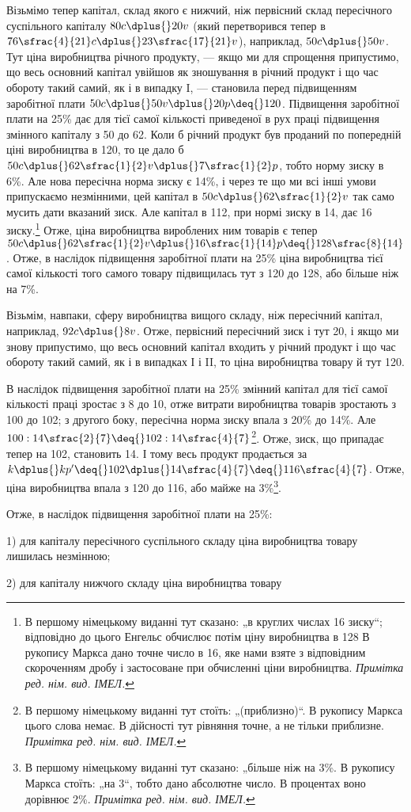 
Візьмімо тепер капітал, склад якого є нижчий, ніж первісний
склад пересічного суспільного капіталу $80 c \dplus{} 20 v$ (який
перетворився тепер в $76\sfrac{4}{21}c \dplus{} 23\sfrac{17}{21}v$), наприклад, $50 c \dplus{} 50 v$.
Тут ціна виробництва річного продукту, — якщо ми для спрощення
припустимо, що весь основний капітал увійшов як зношування
в річний продукт і що час обороту такий самий, як
і в випадку I, — становила перед підвищенням заробітної плати
$50 c \dplus{} 50 v \dplus{} 20 p \deq{} 120$. Підвищення заробітної плати на 25\%
дає для тієї самої кількості приведеної в рух праці підвищення
змінного капіталу з 50 до 62. Коли б річний продукт був
проданий по попередній ціні виробництва в 120, то це дало б
$50 c \dplus{} 62\sfrac{1}{2}v \dplus{} 7\sfrac{1}{2}p$, тобто норму зиску в 6\%.
Але нова пересічна норма зиску є 14\%, і через те що ми всі інші умови
припускаємо незмінними, цей капітал в $50 c \dplus{} 62\sfrac{1}{2}v$ так само
мусить дати вказаний зиск. Але капітал в 112, при нормі зиску
в 14, дає 16 зиску.\footnote*{
В першому німецькому виданні тут сказано: „в круглих числах 16
зиску“; відповідно до цього Енгельс обчислює потім ціну виробництва в 128
В рукопису Маркса дано точне число в 16, яке нами взяте з відповідним
скороченням дробу і застосоване при обчисленні ціни виробництва.
\emph{Примітка ред. нім. вид. ІМЕЛ.}
} Отже, ціна виробництва вироблених
ним товарів є тепер $50 c \dplus{} 62\sfrac{1}{2}v \dplus{} 16\sfrac{1}{14}p \deq{} 128\sfrac{8}{14}$. Отже, в наслідок
підвищення заробітної плати на 25\% ціна виробництва
тієї самої кількості того самого товару підвищилась тут з 120
до 128, або більше ніж на 7\%.

Візьмім, навпаки, сферу виробництва вищого складу, ніж пересічний
капітал, наприклад, $92 c \dplus{} 8 v$. Отже, первісний пересічний
зиск і тут \deq{} 20, і якщо ми знову припустимо, що весь
основний капітал входить у річний продукт і що час обороту
такий самий, як і в випадках І і II, то ціна виробництва товару
й тут \deq{} 120.

В наслідок підвищення заробітної плати на 25\% змінний капітал
для тієї самої кількості праці зростає з 8 до 10, отже
витрати виробництва товарів зростають з 100 до 102; з другого
боку, пересічна норма зиску впала з 20\% до 14\%. Але
$100 : 14\sfrac{2}{7} \deq{} 102 : 14\sfrac{4}{7}$\footnote*{
В першому німецькому виданні тут стоїть: „(приблизно)“. В рукопису
Маркса цього слова немає. В дійсності тут рівняння точне, а не тільки приблизне.
\emph{Примітка ред. нім. вид. ІМЕЛ.}
}. Отже, зиск, що припадає тепер на 102,
становить 14. І тому весь продукт продається за
$k \dplus{} kp' \deq{} 102 \dplus{} 14\sfrac{4}{7} \deq{} 116\sfrac{4}{7}$. Отже, ціна виробництва впала
з 120 до 116, або майже на 3\%\footnote*{
В першому німецькому виданні тут сказано: „більше ніж на 3\%. В рукопису
Маркса стоїть: „на 3“, тобто дано абсолютне число. В процентах воно
дорівнює 2\%. \emph{Примітка ред. нім. вид. ІМЕЛ.}
}.

Отже, в наслідок підвищення заробітної плати на 25\%:

1) для капіталу пересічного суспільного складу ціна виробництва
товару лишилась незмінною;

2) для капіталу нижчого складу ціна виробництва товару
\parbreak{}  %
